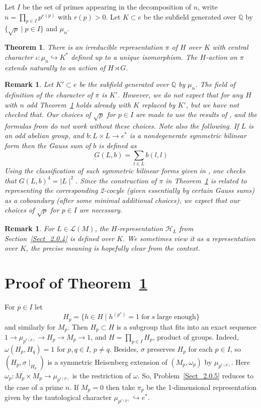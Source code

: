\documentclass[11pt]{amsart}
\newtheorem{Thm}[subsubsection]{Theorem}
\newtheorem{Rem}[subsubsection]{Remark}
\theoremstyle{definition}
\theoremstyle{remark}
\newcommand{\cH}{{\mathcal H}}
\newcommand{\cL}{{\mathcal L}}
\newcommand{\QQ}{{\mathbb Q}}
\newcommand{\hook}[1]{\stackrel{#1}{\hookrightarrow}}
\newcommand{\<}{\langle}
\renewcommand{\>}{\rangle}
\begin{document}
\sssec{} Let $I$ be the set of primes appearing in the decomposition of $n$, write $n=\prod_{p\in I} p^{r(p)}$ with $r(p)>0$. Let $K\subset e$ be the subfield generated over $\QQ$ by $\{\sqrt{p}\mid p\in I\}$ and $\mu_n$. 
\begin{Thm} 
\label{Th_1} There is an irreducible representation $\pi$ of $H$ over $K$ with central character $\iota: \mu_n\hook{} K^*$ defined up to a unique isomorphism. The $H$-action on $\pi$ extends naturally to an action of $H\rtimes G$. 
\end{Thm}

\begin{Rem} Let $K'\subset e$ be the subfield generated over $\QQ$ by $\mu_n$. The field of definition of the character of $\pi$ is $K'$.
However, we do not expect that for any $H$ with $n$ odd Theorem~\ref{Th_1} holds already with $K$ replaced by $K'$, but we have not checked that. Our choices of $\sqrt{p}$ for $p\in I$ are made to use the results of \cite{LL}, and the formulas from \cite{LL} do not work without these choices. Note also the following. If $L$ is an odd abelian group, and $b: L\times L\to e^*$ is a nondegenerate symmetric bilinear form then the Gauss sum of $b$ is defined as 
$$
G(L,b)=\sum_{l\in L} b(l,l)
$$
Using the classification of such symmetric bilinear forms given in \cite{Ko}, one checks that  $G(L,b)^4=\mid L\mid^2$. Since the construction of $\pi$ in Theorem~\ref{Th_1} is related to representing the corresponding 2-cocyle (given essentially by certain Gauss sums) as a coboundary (after some minimal additional choices), we expect that our choices of $\sqrt{p}$ for $p\in I$ are necessary.
\end{Rem}

\begin{Rem} For $L\in\cL(M)$, the $H$-representation $\cH_L$ from Section~\ref{Sect_2.0.4} is defined over $K$. We sometimes view it as a representation over $K$, the precise meaning is hopefully clear from the context.
\end{Rem}


\section{Proof of Theorem~\ref{Th_1}}
\label{Sect_3}

 For $p\in I$ let 
$$
H_p=\{h\in H\mid h^{(p^s)}=1\;\mbox{for}\; s\; \mbox{large enough}\}
$$
and similarly for $M_p$. Then $H_p\subset H$ is a subgroup that fits into an exact sequence $1\to \mu_{p^{r(p)}}\to H_p\to M_p\to 1$, and $H=\prod_{p\in I} H_p$, product of groups. Indeed, $\omega(H_p, H_q)=1$ for $p, q\in I$, $p\ne q$. Besides, $\sigma$ preserves $H_p$ for each $p\in I$, so $(H_p, \sigma\!\mid_{H_p})$ is a symmetric Heisenberg extension of $(M_p,\omega_p)$ by $\mu_{p^{r(p)}}$. Here $\omega_p: M_p\times M_p\to \mu_{p^{r(p)}}$ is the restriction of $\omega$. So, Problem~\ref{Sect_2.0.5} reduces to the case of a prime $n$. If $M_p=0$ then take $\pi_p$ be the 1-dimensional representation given by the tautological character $\mu_{p^{r(p)}}\hook{} e^*$. 
\end{document}
